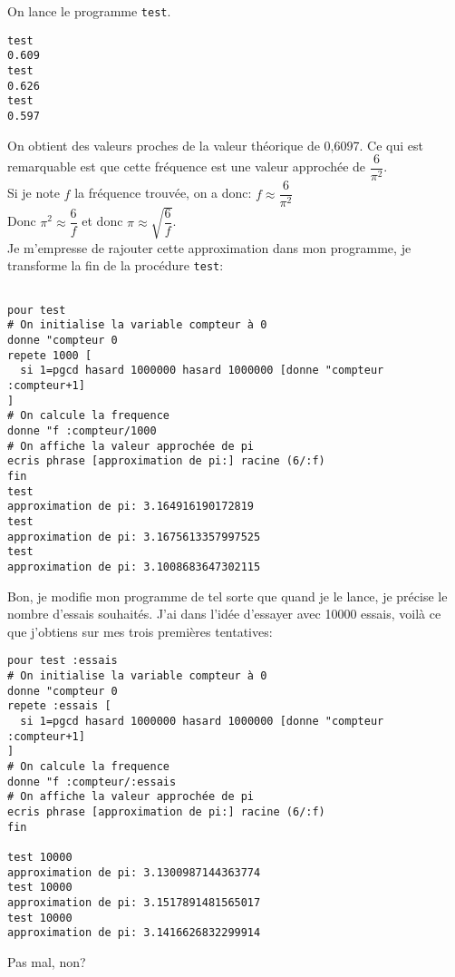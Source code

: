 On lance le programme \texttt{test}.
\begin{verbatim}
test
0.609
test
0.626
test
0.597
\end{verbatim}
On obtient des valeurs proches de la valeur théorique de 0,6097. Ce qui est remarquable est que cette fréquence est une valeur approchée de $\dfrac{6}{\pi^2}$.\\
 Si je note $f$ la fréquence trouvée, on a donc: $f\approx \dfrac{6}{\pi^2}$ \\
Donc $\pi^2\approx\dfrac{6}{f}$ et donc $\pi\approx\sqrt{\dfrac{6}{f}}$.\\
Je m'empresse de rajouter cette approximation dans mon programme, je transforme la fin de la procédure \texttt{test}:
\begin{verbatim}

pour test
# On initialise la variable compteur à 0
donne "compteur 0
repete 1000 [ 
  si 1=pgcd hasard 1000000 hasard 1000000 [donne "compteur :compteur+1]
]
# On calcule la frequence
donne "f :compteur/1000
# On affiche la valeur approchée de pi
ecris phrase [approximation de pi:] racine (6/:f)
fin
test
approximation de pi: 3.164916190172819
test
approximation de pi: 3.1675613357997525
test
approximation de pi: 3.1008683647302115
\end{verbatim}
 Bon, je modifie mon programme de tel sorte que quand je le lance, je précise le nombre d'essais souhaités. J'ai dans l'idée d'essayer avec 10000 essais, voilà ce que j'obtiens sur mes trois premières tentatives:
\begin{verbatim}
pour test :essais
# On initialise la variable compteur à 0
donne "compteur 0
repete :essais [ 
  si 1=pgcd hasard 1000000 hasard 1000000 [donne "compteur :compteur+1]
]
# On calcule la frequence
donne "f :compteur/:essais
# On affiche la valeur approchée de pi
ecris phrase [approximation de pi:] racine (6/:f)
fin

test 10000
approximation de pi: 3.1300987144363774
test 10000
approximation de pi: 3.1517891481565017
test 10000
approximation de pi: 3.1416626832299914
\end{verbatim} 
 Pas mal, non?
